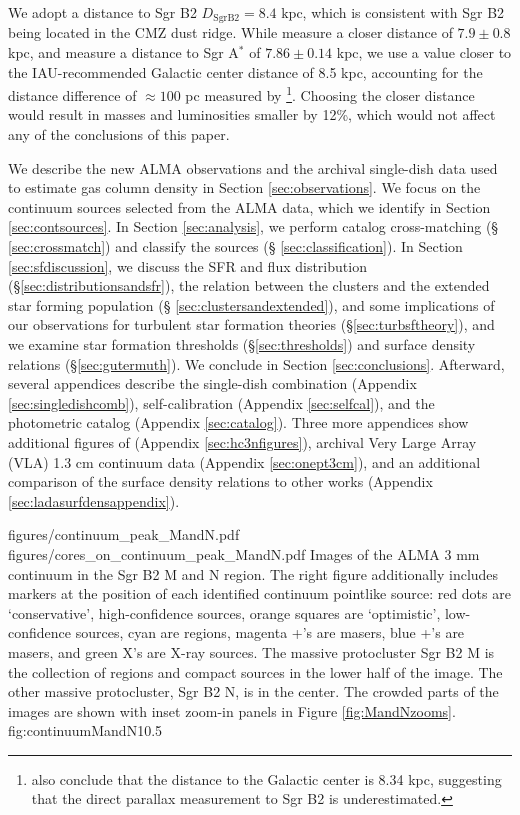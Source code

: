 \documentclass[twocolumn]{aastex61}
\newcommand{\dsgrb}{\ensuremath{8.4\textrm{~kpc}}\xspace}
\begin{document}
We adopt a distance to Sgr B2 $D_{\mathrm{Sgr B2}}=\dsgrb$, which is consistent
with Sgr B2 being located in the CMZ dust ridge.  While \citet{Reid2009a}
measure a closer distance of $7.9\pm0.8$ kpc, and \citet{Boehle2016a}
measure a distance to Sgr A$^*$ of $7.86\pm0.14$ kpc, we use a value closer to the
IAU-recommended Galactic center distance of 8.5 kpc, accounting for the
distance difference of $\approx100$ pc measured by
\citet{Reid2009a}\footnote{\citet{Reid2014a} also conclude that the distance to
the Galactic center is 8.34 kpc, suggesting that the direct parallax
measurement to Sgr B2 is underestimated.}.  Choosing the closer distance would
result in masses and luminosities smaller by 12\%, which would not affect any
of the conclusions of this paper.

We describe the new ALMA observations and the archival single-dish data used
to estimate gas column density in Section
\ref{sec:observations}. We focus on the continuum sources selected from the
ALMA data, which we identify in Section \ref{sec:contsources}.  In Section
\ref{sec:analysis}, we perform catalog cross-matching (\S
\ref{sec:crossmatch}) and classify the sources (\S
\ref{sec:classification}).  In Section \ref{sec:sfdiscussion}, we discuss the
SFR and flux distribution (\S \ref{sec:distributionsandsfr}),
the
relation between the clusters and the extended star forming population (\S
\ref{sec:clustersandextended}), and some implications of our observations
for turbulent star formation theories (\S \ref{sec:turbsftheory}), 
and we examine star formation thresholds (\S \ref{sec:thresholds})
and surface density relations (\S \ref{sec:gutermuth}).   We conclude
in Section \ref{sec:conclusions}.  Afterward, several appendices describe the
single-dish combination (Appendix \ref{sec:singledishcomb}), self-calibration
(Appendix \ref{sec:selfcal}), and the photometric catalog (Appendix
\ref{sec:catalog}).  Three more appendices show additional figures of
\cyanoacetylene (Appendix \ref{sec:hc3nfigures}), archival Very Large Array
(VLA) 1.3 cm continuum data (Appendix \ref{sec:onept3cm}), and an additional
comparison of the surface
density relations to other works (Appendix
\ref{sec:ladasurfdensappendix}).


\FigureTwo
{figures/continuum_peak_MandN.pdf}
{figures/cores_on_continuum_peak_MandN.pdf}
{Images of the ALMA 3 mm continuum in the Sgr B2 M and N region.  The right
figure additionally includes markers at the position of each identified
continuum pointlike source: red dots are `conservative', high-confidence
sources, orange squares are `optimistic', low-confidence sources, cyan are \hii
regions, magenta +'s are \methanol masers, blue +'s are \water masers, and
green X's are X-ray sources.  The massive
protocluster Sgr B2 M is the collection of \hii regions and compact sources in
the lower half of the image.  The other massive protocluster, Sgr B2 N, is in
the center.
The crowded parts of the images are shown with inset zoom-in panels in
Figure \ref{fig:MandNzooms}.
}
{fig:continuumMandN}{1}{0.5\textwidth}
\end{document}
